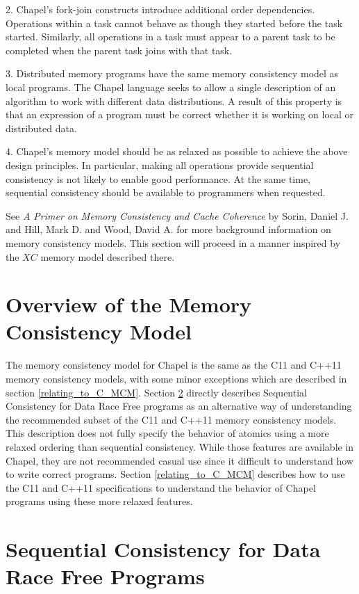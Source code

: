 2. Chapel's fork-join constructs introduce additional order dependencies.
   Operations within a task cannot behave as though they started before the
   task started. Similarly, all operations in a task must appear to a parent
   task to be completed when the parent task joins with that task.

3. Distributed memory programs have the same memory consistency model as local
   programs. The Chapel language seeks to allow a single description of an
   algorithm to work with different data distributions. A result of this
   property is that an expression of a program must be correct whether it is
   working on local or distributed data.

4. Chapel's memory model should be as relaxed as possible to achieve the above
   design principles. In particular, making all operations provide sequential
   consistency is not likely to enable good performance. At the same time,
   sequential consistency should be available to programmers when requested.

See \textit{A Primer on Memory Consistency and Cache Coherence} by Sorin,
Daniel J. and Hill, Mark D. and Wood, David A. for more background information
on memory consistency models. This section will proceed in a manner inspired by
the $XC$ memory model described there.

\section{Overview of the Memory Consistency Model}

The memory consistency model for Chapel is the same as the C11 and C++11 memory
consistency models, with some minor exceptions which are described in section
\ref{relating_to_C_MCM}. Section \ref{SC_for_DRF} directly describes Sequential
Consistency for Data Race Free programs as an alternative way of understanding
the recommended subset of the C11 and C++11 memory consistency models. This
description does not fully specify the behavior of atomics using a more relaxed
ordering than sequential consistency. While those features are available in
Chapel, they are not recommended casual use since it difficult to understand
how to write correct programs. Section \ref{relating_to_C_MCM} describes how to
use the C11 and C++11 specifications to understand the behavior of Chapel
programs using these more relaxed features.

\section{Sequential Consistency for Data Race Free Programs}
\label{SC_for_DRF}

